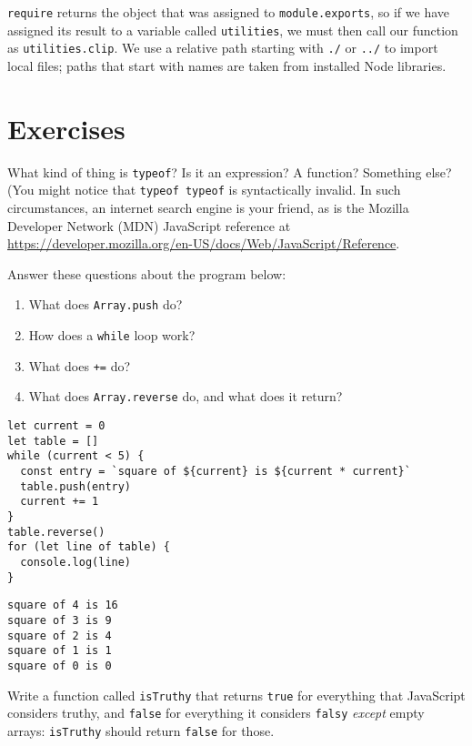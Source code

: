 \texttt{require} returns the object that was assigned to \texttt{module.exports},
so if we have assigned its result to a variable called \texttt{utilities},
we must then call our function as \texttt{utilities.clip}.
We use a relative path starting with \texttt{./} or \texttt{../} to import local files;
paths that start with names are taken from installed Node libraries.

\section{Exercises}\label{s:basics-exercises}


What kind of thing is \texttt{typeof}?
Is it an expression?
A function?
Something else?
(You might notice that \texttt{typeof\ typeof} is syntactically invalid.
In such circumstances,
an internet search engine is your friend,
as is the Mozilla Developer Network (MDN) JavaScript reference
at \url{https://developer.mozilla.org/en-US/docs/Web/JavaScript/Reference}.


Answer these questions about the program below:

\begin{enumerate}
\item
  What does \texttt{Array.push} do?
\item
  How does a \texttt{while} loop work?
\item
  What does \texttt{+=} do?
\item
  What does \texttt{Array.reverse} do, and what does it return?
\end{enumerate}

\begin{verbatim}
let current = 0
let table = []
while (current < 5) {
  const entry = `square of ${current} is ${current * current}`
  table.push(entry)
  current += 1
}
table.reverse()
for (let line of table) {
  console.log(line)
}
\end{verbatim}

\begin{verbatim}
square of 4 is 16
square of 3 is 9
square of 2 is 4
square of 1 is 1
square of 0 is 0
\end{verbatim}


Write a function called \texttt{isTruthy} that returns \texttt{true} for everything that JavaScript considers truthy,
and \texttt{false} for everything it considers \texttt{falsy} \emph{except} empty arrays:
\texttt{isTruthy} should return \texttt{false} for those.

